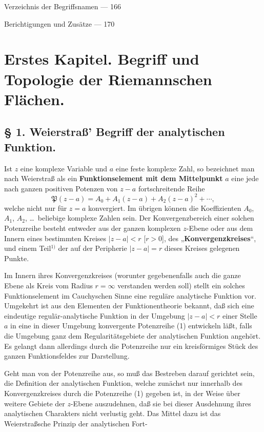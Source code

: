 \documentclass{article}
\begin{document}
Verzeichnis der Begriffsnamen --- 166

Berichtigungen und Zusätze --- 170

\section*{Erstes Kapitel. Begriff und Topologie der Riemannschen Flächen.}

\subsection*{§ 1. Weierstraß' Begriff der analytischen Funktion.}

Ist $z$ eine komplexe Variable und $a$ eine feste komplexe Zahl, so bezeichnet man nach Weierstraß als ein \textbf{Funktionselement mit dem Mittelpunkt} $a$ eine jede nach ganzen positiven Potenzen von $z - a$ fortschreitende Reihe
\[ \mathfrak{P}(z - a) = A_0 + A_1(z - a) + A_2(z - a)^2 + \cdots, \tag{1} \]
welche nicht nur für $z = a$ konvergiert. Im übrigen können die Koeffizienten $A_0$, $A_1$, $A_2$, \dots\ beliebige komplexe Zahlen sein. Der Konvergenzbereich einer solchen Potenzreihe besteht entweder aus der ganzen komplexen $z$-Ebene oder aus dem Innern eines bestimmten Kreises $|z - a| < r$ [$r > 0$], des „\textbf{Konvergenzkreises}“, und einem Teil${}^{1)}$ der auf der Peripherie $|z - a| = r$ dieses Kreises gelegenen Punkte.

Im Innern ihres Konvergenzkreises (worunter gegebenenfalls auch die ganze Ebene als Kreis vom Radius $r = \infty$ verstanden werden soll) stellt ein solches Funktionselement im Cauchyschen Sinne eine reguläre analytische Funktion vor. Umgekehrt ist aus den Elementen der Funktionentheorie bekannt, daß sich eine eindeutige regulär-analytische Funktion in der Umgebung $|z - a| < r$ einer Stelle $a$ in eine in dieser Umgebung konvergente Potenzreihe (1) entwickeln läßt, falls die Umgebung ganz dem Regularitätsgebiete der analytischen Funktion angehört. Es gelangt dann allerdings durch die Potenzreihe nur ein kreisförmiges Stück des ganzen Funktionsfeldes zur Darstellung.

Geht man von der Potenzreihe aus, so muß das Bestreben darauf gerichtet sein, die Definition der analytischen Funktion, welche zunächst nur innerhalb des Konvergenzkreises durch die Potenzreihe (1) gegeben ist, in der Weise über weitere Gebiete der $z$-Ebene auszudehnen, daß sie bei dieser Ausdehnung ihres analytischen Charakters nicht verlustig geht. Das Mittel dazu ist das Weierstraßsche Prinzip der analytischen Fort-
\end{document}
